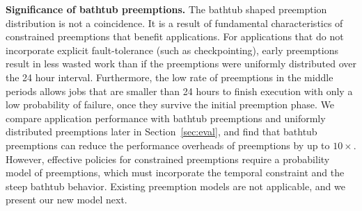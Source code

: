 





\noindent \textbf{Significance of bathtub preemptions.} 
%
%
The bathtub shaped preemption distribution is not a coincidence.
It is a result of fundamental characteristics of constrained preemptions that benefit applications. 
For applications that do not incorporate explicit fault-tolerance (such as checkpointing), early preemptions result in less wasted work than if the preemptions were uniformly distributed over the 24 hour interval.
%
Furthermore, the low rate of preemptions in the middle periods allows jobs that are smaller than 24 hours to finish execution with only a low probability of failure, once they survive the initial preemption phase. 
%
We compare application performance with bathtub preemptions and uniformly distributed preemptions later in Section~\ref{sec:eval}, and find that bathtub preemptions can reduce the performance overheads of preemptions by up to $10\times$.
%
However, effective policies for constrained preemptions  require a probability model of preemptions, which must incorporate the temporal constraint and the steep bathtub behavior. 
%
Existing preemption models are not applicable, and we present our new model next. 
%

